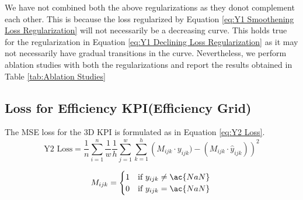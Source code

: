 \documentclass{report} %
\begin{document}
\begin{enumerate}

\end{enumerate}

We have not combined both the above regularizations as they donot complement each other. This is because the loss regularized by Equation \ref{eq:Y1 Smoothening Loss Regularization} will not necessarily be a decreasing curve.
This holds true for the regularization in Equation \ref{eq:Y1 Declining Loss Regularization} as it may not necessarily have gradual transitions in the curve.
Nevertheless, we perform ablation studies with both the regularizations and report the results obtained in Table \ref{tab:Ablation Studies}

\subsection{Loss for Efficiency \ac{KPI}(Efficiency Grid)}\label{sec:Loss for 3D KPI}

The \ac{MSE} loss for the \ac{3D} \ac{KPI} is formulated as in Equation \ref{eq:Y2 Loss}.
\begin{equation}
\text{Y2 Loss} = \frac{1}{n} \sum_{i=1}^{n} \frac{1}{w} \frac{1}{h} \sum_{j=1}^{w} \sum_{k=1}^{h} \left( M_{ijk} \cdot y_{ijk}) - (M_{ijk} \cdot \hat{y}_{ijk})\right)^2
\label{eq:Y2 Loss}
\end{equation}

\begin{equation}
    M_{ijk} = \begin{cases}
        1 & \text{if } y_{ijk} \neq \ac{NaN} \\
        0 & \text{if } y_{ijk} = \ac{NaN} 
        \end{cases} \\
\label{eq:Mask matrix}
\end{equation}
\end{document}
